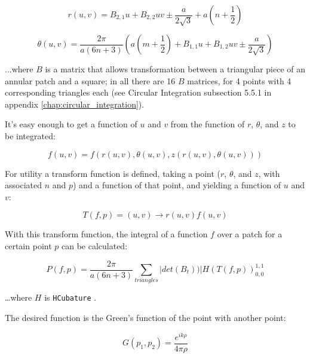 \documentclass[etd,twoside,senior,noacknowledgments]{BYUPhys}
\begin{document}
\begin{equation}
  r\left(u,v\right)=B_{2,1}u+B_{2,2}uv\pm\frac{a}{2\sqrt{3}}+a\left(n+\frac{1}{2}\right)
\end{equation}

\begin{equation}
  \theta\left(u,v\right)=\frac{2\pi}{a(6n+3)}\left(a\left(m+\frac{1}{2}\right)+B_{1,1}u+B_{1,2}uv\pm\frac{a}{2\sqrt{3}}\right)
\end{equation}

...where $B$ is a matrix that allows transformation between a triangular piece of an annular patch and a square; in all there are 16 $B$ matrices, for 4 points with 4 corresponding triangles each (see Circular Integration subsection 5.5.1 in appendix \ref{chap:circular_integration}).

It's easy enough to get a function of $u$ and $v$ from the function of $r$, $\theta$, and $z$ to be integrated:

\begin{equation}
  f\left(u,v\right)=f\left(r\left(u,v\right),\theta\left(u,v\right),z\left(r\left(u,v\right),\theta\left(u,v\right)\right)\right)
\end{equation}

For utility a transform function is defined, taking a point ($r$, $\theta$, and $z$, with associated $n$ and $p$) and a function of that point, and yielding a function of $u$ and $v$:

\begin{equation}
  T\left(f,p\right)=\left(u,v\right)\rightarrow r\left(u,v\right)f\left(u,v\right)
\end{equation}

With this transform function, the integral of a function $f$ over a patch for a certain point $p$ can be calculated:

\begin{equation}
  P\left(f,p\right)=\frac{2\pi}{a\left(6n+3\right)}\sum_{triangles}|det\left(B_{t}\right))|H\left(T\left(f,p\right)\right)_{0,0}^{1,1}
\end{equation}

\ldots where $H$ is \texttt{HCubature} \cite{HCubature}.

The desired function is the Green's function of the point with another point:

\begin{equation} \label{eq:greens}
  G\left(p_{1},p_{2}\right)=\frac{e^{ik\rho}}{4\pi\rho}
\end{equation}
\end{document}
